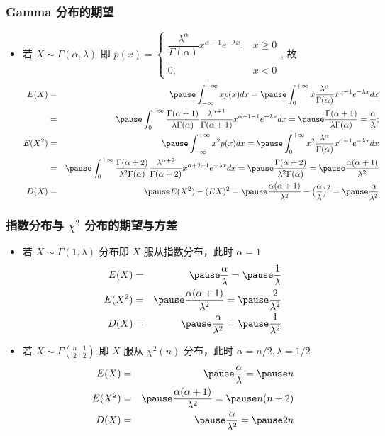 \documentclass[Prob-All.tex]{subfiles}
\begin{document}
	\begin{frame}
		\frametitle{Gamma 分布的期望}
		\begin{itemize}[<+-|alert@+>]
			\item 若 $X\sim \Gamma (\alpha,\lambda)$ 即 $p (x)=\left\{\begin{array}{ll}
				\dfrac{\lambda^\alpha}{\Gamma(\alpha)}x^{\alpha-1}e^{-\lambda x}, & x\ge 0\\
				\\
				0, &x<0
			\end{array}\right.$, 故 \pause
			{\small\begin{eqnarray*}
					E(X)&=&\pause \int_{-\infty}^{+\infty}xp(x)dx=\pause \int_0^{+\infty}x\dfrac{\lambda^\alpha}{\Gamma(\alpha)}x^{\alpha-1}e^{-\lambda x}dx\\
					&=&\pause \int_0^{+\infty}\dfrac{\Gamma(\alpha+1)}{\lambda\Gamma(\alpha)}\dfrac{\lambda^{\alpha+1}}{\Gamma(\alpha+1)}x^{\alpha+1-1}e^{-\lambda x}dx=\pause \dfrac{\Gamma(\alpha+1)}{\lambda\Gamma(\alpha)}=\dfrac{\alpha}{\lambda};\\
					E(X^2)&=&\pause \int_{-\infty}^{+\infty}x^2p(x)dx=\pause \int_0^{+\infty}x^2\dfrac{\lambda^\alpha}{\Gamma(\alpha)}x^{\alpha-1}e^{-\lambda x}dx\\
					&=&\pause \int_0^{+\infty}\dfrac{\Gamma(\alpha+2)}{\lambda^2\Gamma(\alpha)}\dfrac{\lambda^{\alpha+2}}{\Gamma(\alpha+2)}x^{\alpha+2-1}e^{-\lambda x}dx=\pause \dfrac{\Gamma(\alpha+2)}{\lambda^2\Gamma(\alpha)}=\pause \dfrac{\alpha(\alpha+1)}{\lambda^2}\\
					D(X)&=&\pause E(X^2)-(EX)^2=\pause \dfrac{\alpha(\alpha+1)}{\lambda^2}-\big(\dfrac{\alpha}{\lambda}\big)^2=\pause \dfrac{\alpha}{\lambda^2}
			\end{eqnarray*}}

		\end{itemize}
	\end{frame}
	\begin{frame}
		\frametitle{指数分布与 $\chi^2$ 分布的期望与方差}
		\begin{itemize}[<+-|alert@+>]
			\item 若 $X\sim \Gamma (1,\lambda)$ 分布即 $X$ 服从指数分布，此时 $\alpha=1$
			\begin{eqnarray*}
				E(X)&=&\pause \dfrac{\alpha}{\lambda}=\pause \dfrac{1}{\lambda}\\
				E(X^2)&=&\pause \dfrac{\alpha(\alpha+1)}{\lambda^2}=\pause \dfrac{2}{\lambda^2}\\
				D(X)&=&\pause \dfrac{\alpha}{\lambda^2}=\pause \dfrac{1}{\lambda^2}
			\end{eqnarray*}


			\item 若 $X\sim \Gamma (\frac{n}{2},\frac{1}{2})$ 即 $X$ 服从 $\chi^2 (n)$ 分布，此时 $\alpha=n/2, \lambda=1/2$  \begin{eqnarray*}
				E(X)&=&\pause \dfrac{\alpha}{\lambda}=\pause n\\
				E(X^2)&=&\pause \dfrac{\alpha(\alpha+1)}{\lambda^2}=\pause n(n+2)\\
				D(X)&=&\pause \dfrac{\alpha}{\lambda^2}=\pause 2n
			\end{eqnarray*}
		\end{itemize}
	\end{frame}
\end{document}
